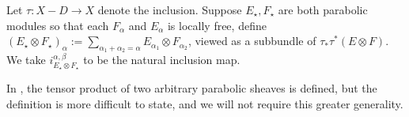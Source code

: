 \begin{definition}
	\label{definition:parabolic-tensor}
	Let $\tau: X - D \to X$ denote the inclusion.
	Suppose $E_\star, F_\star$ are both parabolic modules so that each $F_\alpha$
	and $E_\alpha$ is locally free,
	define $(E_\star \otimes F_\star)_\alpha := \sum_{\alpha_1 + \alpha_2 =
	\alpha} E_{\alpha_1} \otimes F_{\alpha_2}$, viewed as a subbundle of
	$\tau_* \tau^*(E \otimes F)$. We take $i^{\alpha,\beta}_{E_\star \otimes F_\star}$ to be the natural inclusion map.
\end{definition}
\begin{remark}
\notready
	\label{remark:}
	In \cite[p. 136-137]{yokogawa:infinitesimal-deformation}, the tensor
	product of two arbitrary parabolic sheaves is defined, but the
	definition is more difficult to state, and we will not require this
	greater generality.
\end{remark}

